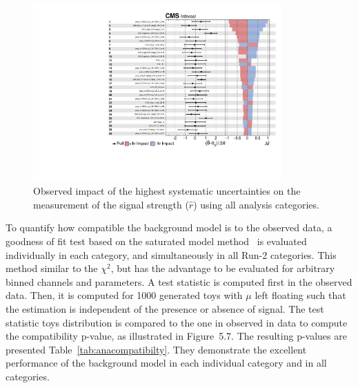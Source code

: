 \begin{figure}[ht!]
\centering
\includegraphics[width=0.85\textwidth,page=1]{Figures/Results/systematics/impacts_observed.pdf}
\caption[Observed impact of the highest systematic uncertainties on the measurement of the signal strength]{Observed impact of the highest systematic uncertainties on the measurement of the signal strength ($\hat{r}$) using all analysis categories.}
\label{fig:syst:observedimpacts}
\end{figure}

To quantify how compatible the background model is to the observed data, a goodness of fit test based on the saturated model method~\cite{statsaturatedmodel} is evaluated individually in each category, and simultaneously in all Run-2 categories. This method similar to the $\chi^{2}$, but has the advantage to be evaluated for arbitrary binned channels and parameters. A test statistic is computed first in the observed data. Then, it is computed for 1000 generated toys with $\mu$ left floating such that the estimation is independent of the presence or absence of signal. The test statistic toys distribution is compared to the one in observed in data to compute the compatibility p-value, as illustrated in Figure~5.7. The resulting p-values are presented Table~\ref{tab:anacompatibilty}. They demonstrate the excellent performance of the background model in each individual category and in all categories.

